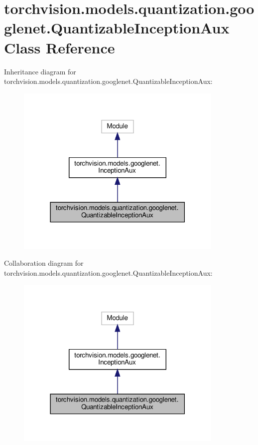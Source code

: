 \hypertarget{classtorchvision_1_1models_1_1quantization_1_1googlenet_1_1QuantizableInceptionAux}{}\section{torchvision.\+models.\+quantization.\+googlenet.\+Quantizable\+Inception\+Aux Class Reference}
\label{classtorchvision_1_1models_1_1quantization_1_1googlenet_1_1QuantizableInceptionAux}


Inheritance diagram for torchvision.\+models.\+quantization.\+googlenet.\+Quantizable\+Inception\+Aux\+:
\nopagebreak
\begin{figure}[H]
\begin{center}
\leavevmode
\includegraphics[width=282pt]{classtorchvision_1_1models_1_1quantization_1_1googlenet_1_1QuantizableInceptionAux__inherit__graph}
\end{center}
\end{figure}


Collaboration diagram for torchvision.\+models.\+quantization.\+googlenet.\+Quantizable\+Inception\+Aux\+:
\nopagebreak
\begin{figure}[H]
\begin{center}
\leavevmode
\includegraphics[width=282pt]{classtorchvision_1_1models_1_1quantization_1_1googlenet_1_1QuantizableInceptionAux__coll__graph}
\end{center}
\end{figure}
